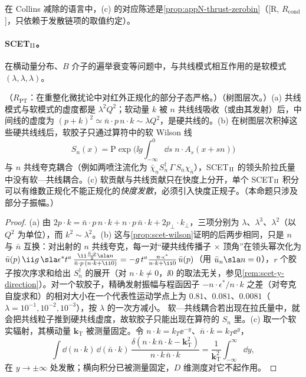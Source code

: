在 Collins 减除的语言中，(c) 的对应陈述是\cref{prop:appN-thrust-zerobin}（[R, $R_{\mathrm{cond}}$]，只依赖于发散链项的取值约定）。

\paragraph{SCET$_{\rm II}$。}在横动量分布、$B$ 介子的遍举衰变等问题中，与共线模式相互作用的是软模式 $(\lambda,\lambda,\lambda)$。

\begin{proposition}\label{prop:scet-scet2}
（$R_{\mathrm{PT}}$：在重整化微扰论中对红外正规化的部分子态严格。）（树图层次。）(a) 共线模式与软模式的虚度都是 $\lambda^2Q^2$；软动量 $k$ 被 $n$ 共线线吸收（或由其发射）后，中间线的虚度为 $(p+k)^2\simeq\bar n\cdot p\,n\cdot k\sim\lambda Q^2$，是硬共线的。(b) 在树图层次积掉这些硬共线线后，软胶子只通过算符中的软 Wilson 线
\begin{equation}\label{eq:scet-Sn}
S_n(x)=\mathrm P\exp\Big(\ii g\int_{-\infty}^0\dd s\;n\cdot A_s(x+sn)\Big)
\end{equation}
与 $n$ 共线夸克耦合（例如两喷注流化为 $\bar\chi_nS_n^\dagger\,\Gamma\,S_{\bar n}\chi_{\bar n}$），SCET$_{\rm II}$ 的领头阶拉氏量中没有软—共线耦合。(c) 软贡献与共线贡献只在快度上分开，单个 SCET$_{\rm II}$ 积分可以有维数正规化不能正规化的\emph{快度发散}，必须引入快度正规子\cite{Hill:2002vw,BauerEtAl2002}。（本命题只涉及部分子振幅。）
\end{proposition}

\begin{proof}
(a) 由 $2p\cdot k=\bar n\cdot p\,n\cdot k+n\cdot p\,\bar n\cdot k+2p_\perp\cdot k_\perp$，三项分别为 $\lambda$、$\lambda^3$、$\lambda^2$（以 $Q^2$ 为单位），而 $k^2\sim\lambda^2$。(b) 这与\cref{prop:scet-wilson}证明的后两步相同，只是 $n$ 与 $\bar n$ 互换：对出射的 $n$ 共线夸克，每一对“硬共线传播子 × 顶角”在领头幂次化为 $\bar u(p)\,\ii g\,\sla\epsilon^*t^a\,\frac{\ii\frac{\bar n\cdot p}{2}\sla n}{\bar n\cdot p\,(n\cdot k+\ii0)}=-g\,t^a\frac{n\cdot\epsilon^*}{n\cdot k+\ii0}\,\bar u(p)$（用 $\bar u_n\sla n=0$），$r$ 个胶子按次序求和给出 $S_n^\dagger$ 的展开（对 $n\cdot k\neq0$，$\ii0$ 的取法无关，参见\cref{rem:scet-y-direction}）。对一个软胶子，精确发射振幅与程函因子 $-n\cdot\epsilon^*/n\cdot k$ 之差（对夸克自旋求和）的相对大小在一个代表性运动学点上为 $0.81$、$0.081$、$0.0081$（$\lambda=10^{-1},10^{-2},10^{-3}$），按 $\lambda$ 的一次方减小。%
软—共线耦合若出现在拉氏量中，就会把共线粒子推到硬共线虚度，故软胶子只能出现在算符的 $S_n$ 里。(c) 取一个软实辐射，其横动量 $\bm k_{\mathrm T}$ 被测量固定。令 $n\cdot k=k_T\ee^{-y}$、$\bar n\cdot k=k_T\ee^{y}$，
\begin{equation}\label{eq:scet-rapdiv}
\int\dd(n\cdot k)\,\dd(\bar n\cdot k)\,\frac{\delta(n\cdot k\,\bar n\cdot k-\bm k_{\mathrm T}^2)}{n\cdot k\,\bar n\cdot k}=\frac{1}{\bm k_{\mathrm T}^2}\int_{-\infty}^{\infty}\dd y ,
\end{equation}
在 $y\to\pm\infty$ 处发散；横向积分已被测量固定，$D$ 维测度对它不起作用。
\end{proof}

